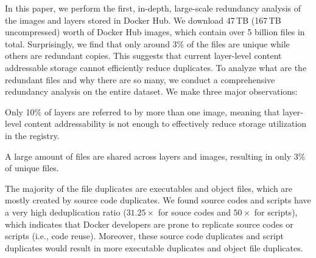 In this paper, we perform the first, in-depth, large-scale redundancy
analysis of the images and layers stored in Docker Hub.
%
We download 47\,TB (167\,TB uncompressed) worth of Docker Hub images,
%
%
which contain over 5 billion files in total.
%
%
%
%
Surprisingly, we find that only around 3\% of the files are unique
while others are redundant copies. This suggests that current layer-level content
addressable storage cannot efficiently reduce duplicates.
%
To analyze what are the redundant files and why there are so many,
we conduct a comprehensive redundancy analysis on the entire dataset.
%
We make three major observations:
%
\begin{compactitemize}
%
\item Only 10\% of layers are referred to by more than one image, 
meaning that layer-level content addressability is not enough to
effectively reduce storage utilization in the registry.
%
\item A large amount of files are shared across layers and images,
resulting in only 3\% of unique files.
%
\item {}
The majority of the file duplicates are executables and object files, which are
mostly created by source code duplicates.
	We found source codes and scripts have a very high deduplication ratio (\textbf{$31.25\times$} for souce codes and \textbf{$50\times$} for scripts), which indicates that Docker developers are prone to replicate source codes or scripts (i.e., code reuse). Moreover, these source code duplicates and script duplicates would result in more executable duplicates and object file duplicates.

\end{compactitemize}

